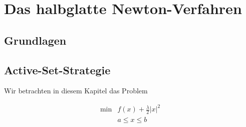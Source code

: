 \chapter{Das halbglatte Newton-Verfahren}

\section{Grundlagen}


\section{Active-Set-Strategie}

Wir betrachten in diesem Kapitel das Problem
\begin{definition}
\begin{align}
  \min & f(x) + \frac{\lambda}{2} |x|^2 \\
       & a \leq x \leq b
\end{align}
\end{definition}


